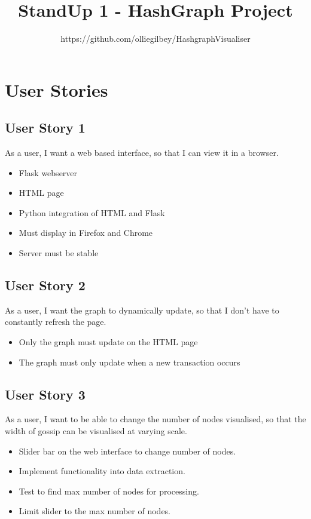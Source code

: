 \documentclass[a4paper,10pt]{article}
\begin{document}
\title{StandUp 1 - HashGraph Project}
\author{https://github.com/olliegilbey/HashgraphVisualiser}
\date{}
\maketitle

\section{User Stories}
\subsection{User Story 1} As a user, I want a web based interface, so that I can view it in a browser.
\begin{itemize}
	\item Flask webserver
	\item HTML page
	\item Python integration of HTML and Flask
	\item Must display in Firefox and Chrome
	\item Server must be stable
\end{itemize}
\subsection{User Story 2} As a user, I want the graph to dynamically update, so that I don't have to constantly refresh the page.
\begin{itemize}
	\item Only the graph must update on the HTML page
	\item The graph must only update when a new transaction occurs
\end{itemize}
\subsection{User Story 3} As a user, I want to be able to change the number of nodes visualised, so that the width of gossip can be visualised at varying scale.
\begin{itemize}
	\item Slider bar on the web interface to change number of nodes.
	\item Implement functionality into data extraction.
	\item Test to find max number of nodes for processing.
	\item Limit slider to the max number of nodes.
\end{itemize}
\end{document}
